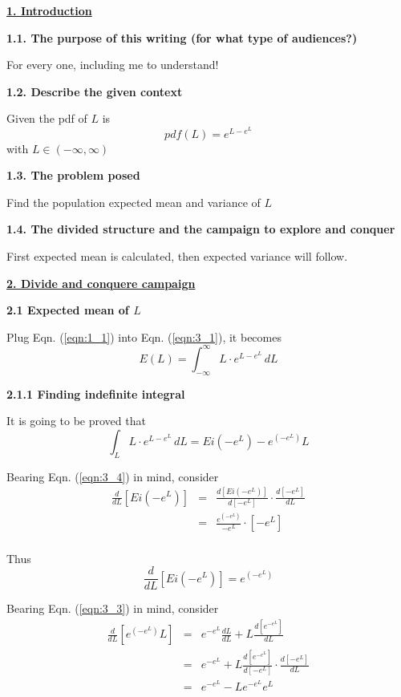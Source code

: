 \documentclass{beamer}
\begin{document}
\underline{\textbf{1. Introduction}}

\textbf{  1.1. The purpose of this writing (for what type of audiences?)}

For every one, including me to understand!

\textbf{  1.2. Describe the given context}

Given the pdf of $L$ is
\begin{equation}
\label{eqn:1_1}
pdf(L) = e^{L-e^L}
\end{equation}
with $L \in (-\infty, \infty)$

\textbf{  1.3. The problem posed}

Find the population expected mean and variance of $L$

\textbf{  1.4. The divided structure and the campaign to explore and conquer}

First expected mean is calculated, then expected variance will follow.

\underline{\textbf{2. Divide and conquere campaign}}

\textbf{2.1 Expected mean of $L$}

Plug Eqn. (\ref{eqn:1_1}) into Eqn. (\ref{eqn:3_1}), it becomes
\begin{equation}
\label{eqn:2_1}
E(L) = \int_{-\infty}^{\infty} \! L \cdot e^{L-e^L} \, dL
\end{equation}

\textbf{2.1.1 Finding indefinite integral}

It is going to be proved that 
\begin{equation}
\label{eqn:2_2}
\int_L \! L \cdot e^{L-e^L} \, dL = Ei(-e^L)-e^{(-e^L)} L
\end{equation}

Bearing Eqn. (\ref{eqn:3_4}) in mind, consider
\begin{eqnarray*}
\frac{d}{dL} \left[ Ei(-e^L) \right] 
	&=& \frac{d \left[ Ei(-e^L) \right] }{d \left[ -e^L \right]} \cdot \frac{d \left[ -e^L \right]}{dL} \\
	&=& \frac{ e^{(-e^L)}  }{ -e^L } \cdot  \left[ -e^L \right] \\
\end{eqnarray*}

Thus
\begin{equation}
\label{eqn:2_3}
\frac{d}{dL} \left[ Ei(-e^L) \right]  = e^{(-e^L)}
\end{equation}

Bearing Eqn. (\ref{eqn:3_3}) in mind, consider
\begin{eqnarray*}
\frac{d}{dL} \left[ e^{(-e^L)} L \right]  
	&=& e^{-e^L} \frac{dL}{dL} + L \frac{d \left[ e^{-e^L}  \right]}{dL} \\
	&=& e^{-e^L} + L \frac{d \left[ e^{-e^L}  \right]}{d \left[ -e^L  \right] } \cdot \frac{d \left[ -e^L  \right]}{dL} \\
	&=& e^{-e^L} - L  e^{-e^L}   e^L  \\
\end{eqnarray*}
\end{document}

